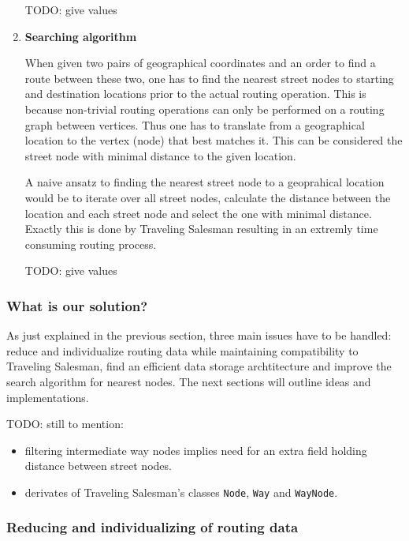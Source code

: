 \begin{enumerate}
		TODO: give values
											
	\item \textbf{Searching algorithm}
	
		When given two pairs of geographical coordinates and an order to find a route between these two, one has to find the nearest street nodes to starting and destination locations prior to the actual routing operation. This is because non-trivial routing operations can only be performed on a routing graph between vertices. Thus one has to translate from a geographical location to the vertex (node) that best matches it. This can be considered the street node with minimal distance to the given location.\newline
				
		A naive ansatz to finding the nearest street node 	to a geoprahical location would be to iterate over all street nodes, calculate the distance between the location and each street node and select the one with minimal distance. Exactly this is done by Traveling Salesman resulting in an extremly time consuming routing process.\newline
		
		TODO: give values

\end{enumerate}


\subsubsection{What is our solution?}

As just explained in the previous section, three main issues have to be handled: reduce and individualize routing data while maintaining compatibility to Traveling Salesman, find an efficient data storage archtitecture and improve the search algorithm for nearest nodes. The next sections will outline ideas and implementations. \newline

TODO: still to mention:
\begin{itemize}
	\item filtering intermediate way nodes implies need for an extra field holding distance between street nodes.
	\item derivates of Traveling Salesman's classes \texttt{Node}, \texttt{Way} and \texttt{WayNode}.
\end{itemize}

\subsubsection{Reducing and individualizing of routing data}


